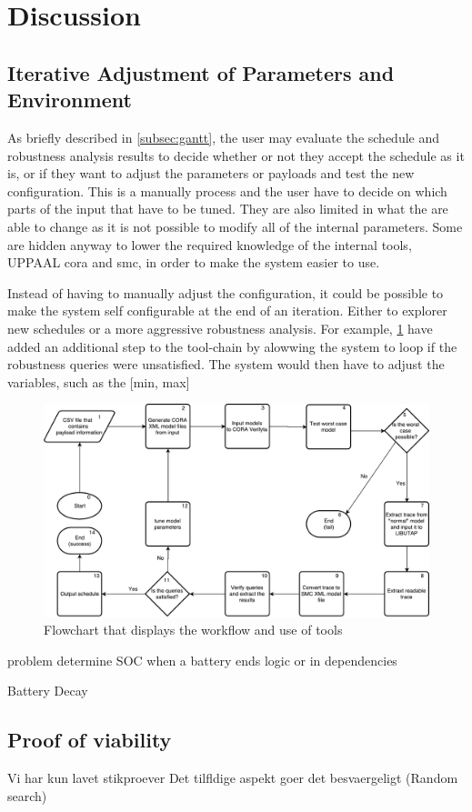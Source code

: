 \section{Discussion} \label{sec:discussion}

\subsection{Iterative Adjustment of Parameters and Environment} \label{subsec:disc_itt}
As briefly described in \cref{subsec:gantt}, the user may evaluate the schedule and robustness analysis results to decide whether or not they accept the schedule as it is, or if they want to adjust the parameters or payloads and test the new configuration. This is a manually process and the user have to decide on which parts of the input that have to be tuned. They are also limited in what the are able to change as it is not possible to modify all of the internal parameters. Some are hidden anyway to lower the required knowledge of the internal tools, UPPAAL \gls{cora} and \gls{smc}, in order to make the system easier to use. 

Instead of having to manually adjust the configuration, it could be possible to make the system self configurable at the end of an iteration. Either to explorer new schedules or a more aggressive robustness analysis. For example, \cref{fig:tool_self_config}  have added an additional step to the tool-chain by alowwing the system to loop if the robustness queries were unsatisfied. The system would then have to adjust the variables, such as the [min, max]

\begin{figure}[h]
	\includegraphics[width=\textwidth]{graphics/tool_chain.pdf}
	\caption{Flowchart that displays the workflow and use of tools}
	\label{fig:tool_self_config}
\end{figure}

problem determine SOC when a battery ends 
logic or in dependencies

Battery Decay


\subsection{Proof of viability}
Vi har kun lavet stikproever
Det tilfldige aspekt goer det besvaergeligt (Random search)